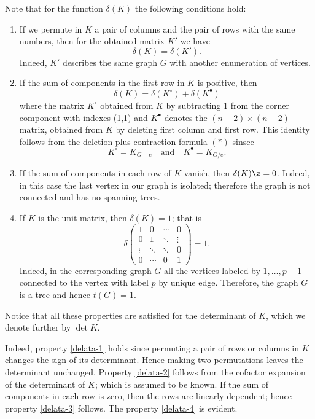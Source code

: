 Note that for the function $\delta(K)$ the following conditions hold:
\begin{enumerate}
\item\label{delata-1} If we permute in $K$ a pair of columns and the pair of rows with the same numbers, then for the obtained matrix $K'$ we have 
\[\delta(K)=\delta(K').\]
Indeed, $K'$ describes the same graph $G$ with another enumeration of vertices.

\item \label{delata-2}
If the sum of components in the first row in $K$ is positive, then
\[\delta(K)=\delta(K^{\circ})+\delta(K^{\bullet})\]
where the matrix $K^{\circ}$ obtained from $K$ by subtracting 1 from the corner component with indexes (1,1) and $K^{\bullet}$ denotes the $(n-2)\times(n-2)$-matrix, obtained from $K$ by deleting first column and first row.
This identity follows from the deletion-plus-contraction formula $({*})$ sinsce \[K^{\circ}=K_{G- e}\quad\text{and}\quad K^{\bullet}=K_{G/e}.\]

\item\label{delata-3} If the sum of components in each row of $K$ vanish, then $\delta(K)\z=0$. 
Indeed, in this case the last vertex in our graph is isolated;
therefore the graph is not connected and has no spanning trees.

\item\label{delata-4} If $K$ is the unit matrix, then $\delta(K)=1$;
that is
\[
\delta\left(
\begin{matrix}
1&0&\cdots&0
\\
0&1&\ddots&\vdots
\\
\vdots&\ddots&\ddots&0
\\
0&\cdots&0&1
\end{matrix}
\right)=1.
\]
Indeed, in the corresponding graph $G$ all the vertices labeled by $1,\dots,p-1$ connected to the vertex with label $p$ by unique edge. 
Therefore, the graph $G$ is a tree and hence $t(G)=1$.
\end{enumerate}

Notice that all these properties are satisfied for the determinant of $K$, which we denote further by $\det K$.

Indeed, property \ref{delata-1} holds since permuting a pair of rows or columns in $K$ changes the sign of its determinant.
Hence making two permutations leaves the determinant unchanged.
Property \ref{delata-2} follows from the cofactor expansion of the determinant of $K$;
which is assumed to be known. 
If the sum of components in each row is zero, then the rows are linearly dependent;
hence property \ref{delata-3} follows.
The property \ref{delata-4} is evident.

